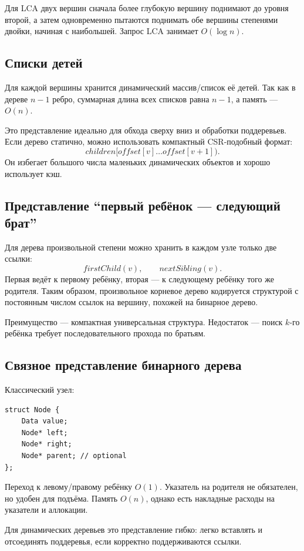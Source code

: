 Для LCA двух вершин сначала более глубокую вершину поднимают до уровня второй,
а затем одновременно пытаются поднимать обе вершины степенями двойки, начиная с
наибольшей. Запрос LCA занимает $O(\log n)$.

\subsection{Списки детей}

Для каждой вершины хранится динамический массив/список её детей. Так как в
дереве $n-1$ ребро, суммарная длина всех списков равна $n-1$, а память ---
$O(n)$.

Это представление идеально для обхода сверху вниз и обработки поддеревьев.
Если дерево статично, можно использовать компактный CSR-подобный формат:
\[
 children[offset[v]\ldots offset[v+1]).
\]
Он избегает большого числа маленьких динамических объектов и хорошо использует
кэш.

\subsection{Представление ``первый ребёнок --- следующий брат''}

Для дерева произвольной степени можно хранить в каждом узле только две ссылки:
\[
    firstChild(v),\qquad nextSibling(v).
\]
Первая ведёт к первому ребёнку, вторая --- к следующему ребёнку того же родителя.
Таким образом, произвольное корневое дерево кодируется структурой с постоянным
числом ссылок на вершину, похожей на бинарное дерево.

Преимущество --- компактная универсальная структура. Недостаток --- поиск $k$-го
ребёнка требует последовательного прохода по братьям.

\subsection{Связное представление бинарного дерева}

Классический узел:
\begin{verbatim}
struct Node {
    Data value;
    Node* left;
    Node* right;
    Node* parent; // optional
};
\end{verbatim}

Переход к левому/правому ребёнку $O(1)$. Указатель на родителя не обязателен, но
удобен для подъёма. Память $O(n)$, однако есть накладные расходы на указатели и
аллокации.

Для динамических деревьев это представление гибко: легко вставлять и отсоединять
поддеревья, если корректно поддерживаются ссылки.

